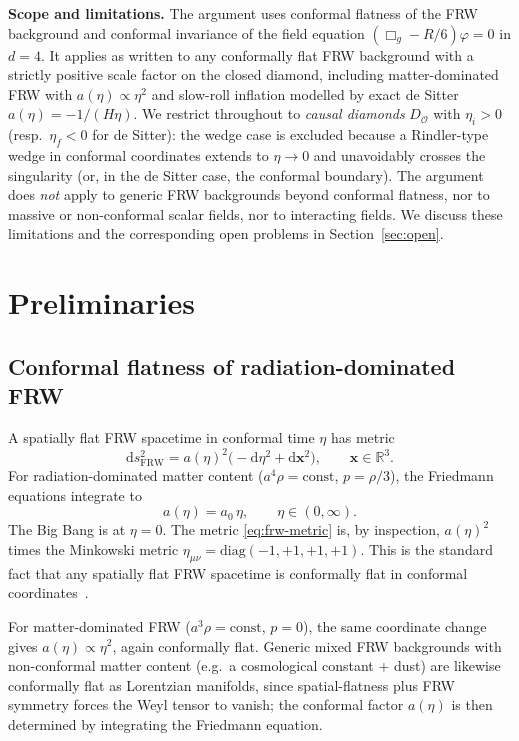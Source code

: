 \documentclass[11pt]{article}
\theoremstyle{definition}
\newcommand{\R}{\mathbb{R}}
\newcommand{\OO}{\mathcal{O}}
\newcommand{\FRW}{\mathrm{FRW}}
\begin{document}
\medskip

\noindent\textbf{Scope and limitations.} The argument uses conformal flatness of the FRW background and conformal invariance of the field equation $(\Box_g - R/6)\varphi=0$ in $d=4$. It applies as written to any conformally flat FRW background with a strictly positive scale factor on the closed diamond, including matter-dominated FRW with $a(\eta)\propto \eta^2$ and slow-roll inflation modelled by exact de Sitter $a(\eta)=-1/(H\eta)$. We restrict throughout to \emph{causal diamonds} $D_\OO$ with $\eta_i>0$ (resp.\ $\eta_f<0$ for de Sitter): the wedge case is excluded because a Rindler-type wedge in conformal coordinates extends to $\eta\to 0$ and unavoidably crosses the singularity (or, in the de Sitter case, the conformal boundary). The argument does \emph{not} apply to generic FRW backgrounds beyond conformal flatness, nor to massive or non-conformal scalar fields, nor to interacting fields. We discuss these limitations and the corresponding open problems in Section~\ref{sec:open}.

\section{Preliminaries}\label{sec:prelim}

\subsection{Conformal flatness of radiation-dominated FRW}\label{sec:conformal}

A spatially flat FRW spacetime in conformal time $\eta$ has metric
\begin{equation}
\label{eq:frw-metric}
\mathrm{d}s^2_\FRW = a(\eta)^2 \big(-\mathrm{d}\eta^2 + \mathrm{d}\mathbf{x}^2\big),
\qquad \mathbf{x}\in\R^3.
\end{equation}
For radiation-dominated matter content ($a^4\rho = \mathrm{const}$, $p=\rho/3$), the Friedmann equations integrate to
\begin{equation}
\label{eq:rd-scale}
a(\eta) = a_0\,\eta, \qquad \eta\in(0,\infty).
\end{equation}
The Big Bang is at $\eta=0$. The metric \eqref{eq:frw-metric} is, by inspection, $a(\eta)^2$ times the Minkowski metric $\eta_{\mu\nu} = \mathrm{diag}(-1,+1,+1,+1)$. This is the standard fact that any spatially flat FRW spacetime is conformally flat in conformal coordinates~\cite[\S5.1, \S5.3]{Wald1994}.

For matter-dominated FRW ($a^3\rho = \mathrm{const}$, $p=0$), the same coordinate change gives $a(\eta) \propto \eta^2$, again conformally flat. Generic mixed FRW backgrounds with non-conformal matter content (e.g.\ a cosmological constant + dust) are likewise conformally flat as Lorentzian manifolds, since spatial-flatness plus FRW symmetry forces the Weyl tensor to vanish; the conformal factor $a(\eta)$ is then determined by integrating the Friedmann equation.
\end{document}
